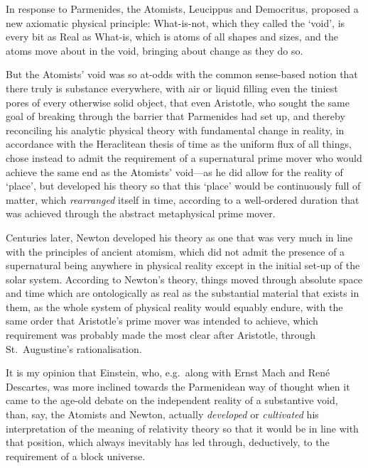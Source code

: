 In response to Parmenides, the Atomists, Leucippus and Democritus, proposed a new axiomatic physical principle: What-is-not, which they called the `void', is every bit as Real as What-is, which is atoms of all shapes and sizes, and the atoms move about in the void, bringing about change as they do so. 

But the Atomists' void was so at-odds with the common sense-based notion that there truly is substance everywhere, with air or liquid filling even the tiniest pores of every otherwise solid object, that even Aristotle, who sought the same goal of breaking through the barrier that Parmenides had set up, and thereby reconciling his analytic physical theory with fundamental change in reality, in accordance with the Heraclitean thesis of time as the uniform flux of all things, chose instead to admit the requirement of a supernatural prime mover who would achieve the same end as the Atomists' void---as he did allow for the reality of `place', but developed his theory so that this `place' would be continuously full of matter, which \textit{rearranged} itself in time, according to a well-ordered duration that was achieved through the abstract metaphysical prime mover.

Centuries later, Newton developed his theory as one that was very much in line with the principles of ancient atomism, which did not admit the presence of a supernatural being anywhere in physical reality except in the initial set-up of the solar system. According to Newton's theory, things moved through absolute space and time which are ontologically as real as the substantial material that exists in them, as the whole system of physical reality would equably endure, with the same order that Aristotle's prime mover was intended to achieve, which requirement was probably made the most clear after Aristotle, through St.~Augustine's rationalisation. 

It is my opinion that Einstein, who, e.g.~along with Ernst Mach and Ren\'{e} Descartes, was more inclined towards the Parmenidean way of thought when it came to the age-old debate on the independent reality of a substantive void, than, say, the Atomists and Newton, actually \textit{developed} or \textit{cultivated} his interpretation of the meaning of relativity theory so that it would be in line with that position, which always inevitably has led through, deductively, to the requirement of a block universe. 


